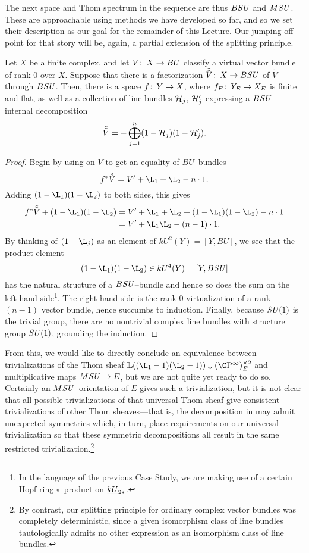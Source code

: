 The next space and Thom spectrum in the sequence are thus \(B\mathit{SU}\) and \(M\mathit{SU}\).  These are approachable using methods we have developed so far, and so we set their description as our goal for the remainder of this Lecture.  Our jumping off point for that story will be, again, a partial extension of the splitting principle.
\begin{lemma}\label{SplittingPrincipleForBSU}
Let \(X\) be a finite complex, and let \(\tilde V\colon\thinspace X \to BU\) classify a virtual vector bundle of rank \(0\) over \(X\).  Suppose that there is a factorization \(\tilde{\tilde V}\colon\thinspace X \to B\mathit{SU}\) of \(\tilde V\) through \(B\mathit{SU}\).  Then, there is a space \(f\colon\thinspace Y \to X\), where \(f_E\colon\thinspace Y_E \to X_E\) is finite and flat, as well as a collection of line bundles \(\mathcal{H}_j\), \(\mathcal{H}'_j\) expressing a \(B\mathit{SU}\)--internal decomposition \[\tilde{\tilde V} = -\bigoplus_{j=1}^n (1 - \mathcal{H}_j)(1 - \mathcal{H}'_j).\]
\end{lemma}
\begin{proof}
Begin by using  on \(V\) to get an equality of \(BU\)--bundles \[f^* \tilde{\tilde V} = V' + \L_1 + \L_2 - n \cdot 1.\]  Adding \((1 - \L_1)(1 - \L_2)\) to both sides, this gives
\begin{align*}
f^* \tilde{\tilde V} + (1 - \L_1)(1 - \L_2) & = V' + \L_1 + \L_2 + (1 - \L_1)(1 - \L_2) - n \cdot 1 \\
& = V' + \L_1\L_2 - (n-1) \cdot 1.
\end{align*}
By thinking of \((1 - \L_j)\) as an element of \(kU^2(Y) = [Y, BU]\), we see that the product element \[(1 - \L_1)(1 - \L_2) \in kU^4(Y) = [Y, B\SU]\] has the natural structure of a \(B\mathit{SU}\)--bundle and hence so does the sum on the left-hand side\footnote{In the language of the previous Case Study, we are making use of a certain Hopf ring \(\circ\)--product on \(\underline{\smash{kU}}_{2*}\).}.  The right-hand side is the rank \(0\) virtualization of a rank \((n-1)\) vector bundle, hence succumbs to induction.  Finally, because \(\mathit{SU}(1)\) is the trivial group, there are no nontrivial complex line bundles with structure group \(\mathit{SU}(1)\), grounding the induction.
\end{proof}

From this, we would like to directly conclude an equivalence between trivializations of the Thom sheaf \(\ThomSheaf{(\L_1 - 1)(\L_2 - 1)} \downarrow (\CP^\infty)^{\times 2}_E\) and multiplicative maps \(M\mathit{SU} \to E\), but we are not quite yet ready to do so.  Certainly an \(M\mathit{SU}\)--orientation of \(E\) gives such a trivialization, but it is not clear that all possible trivializations of that universal Thom sheaf give consistent trivializations of other Thom sheaves---that is, the decomposition in  may admit unexpected symmetries which, in turn, place requirements on our universal trivialization so that these symmetric decompositions all result in the same restricted trivialization.\footnote{By contrast, our splitting principle for ordinary complex vector bundles was completely deterministic, since a given isomorphism class of line bundles tautologically admits no other expression as an isomorphism class of line bundles.}

